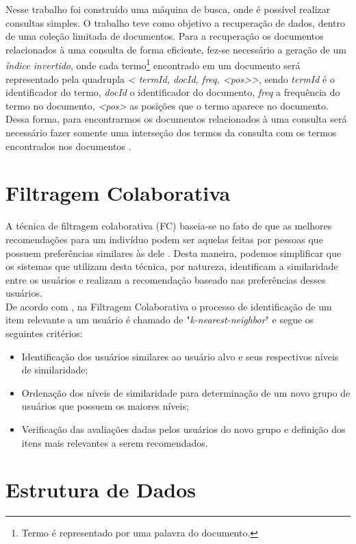 \documentclass[12pt]{article}
\begin{document}
Nesse trabalho foi construído uma máquina de busca, onde é possível realizar consultas simples. O trabalho teve como objetivo a recuperação de dados, dentro de uma coleção limitada de documentos. Para a recuperação os documentos relacionados à uma consulta de forma eficiente, fez-se necessário a geração de um \textit{índice invertido}, onde cada termo\footnote{Termo é representado por uma palavra do documento.} encontrado em um documento será representado pela quadrupla \textit{< termId, docId, freq, <pos>>}, sendo \textit{termId} é o identificador do termo, \textit{docId} o identificador do documento, \textit{freq} a frequência do termo no documento, \textit{<pos>} as posições que o termo aparece no documento. Dessa forma, para encontrarmos os documentos relacionados à uma consulta será necessário fazer somente uma interseção dos termos da consulta  com os termos encontrados nos documentos .

\section{Filtragem Colaborativa} \label{sec:filtragem}

A técnica de filtragem colaborativa (FC) baseia-se no fato de que as melhores recomendações para um indivíduo podem ser aquelas feitas por pessoas que possuem preferências similares às dele \cite{sampaio2006aprendizagem}. Desta maneira, podemos simplificar que os sistemas que utilizam desta técnica, por natureza, identificam a similaridade entre os usuários e realizam a recomendação baseado nas preferências desses usuários.\\
\indent De acordo com \cite{kajimoto2007sistemas}, na Filtragem Colaborativa o processo de identificação de um item relevante a um usuário é chamado de "\textit{k-nearest-neighbor}" e segue os seguintes critérios: 
 
\begin{itemize}
\item Identificação dos usuários similares ao usuário alvo e seus respectivos níveis de similaridade;
\item Ordenação dos níveis de similaridade para determinação de um novo grupo de usuários que possuem os maiores níveis; 
\item Verificação das avaliações dadas pelos usuários do novo grupo e definição dos itens mais relevantes a serem recomendados.
\end{itemize} 

\section{Estrutura de Dados} \label{sec:estrutura-dados}
\end{document}
